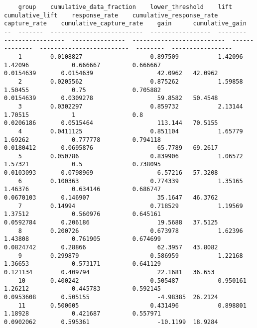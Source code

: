 \documentclass[11pt]{article}
\begin{document}
    
    \begin{verbatim}
    group    cumulative_data_fraction    lower_threshold    lift      cumulative_lift    response_rate    cumulative_response_rate    capture_rate    cumulative_capture_rate    gain      cumulative_gain
--  -------  --------------------------  -----------------  --------  -----------------  ---------------  --------------------------  --------------  -------------------------  --------  -----------------
    1        0.0108827                   0.897509           1.42096   1.42096            0.666667         0.666667                    0.0154639       0.0154639                  42.0962   42.0962
    2        0.0205562                   0.875262           1.59858   1.50455            0.75             0.705882                    0.0154639       0.0309278                  59.8582   50.4548
    3        0.0302297                   0.859732           2.13144   1.70515            1                0.8                         0.0206186       0.0515464                  113.144   70.5155
    4        0.0411125                   0.851104           1.65779   1.69262            0.777778         0.794118                    0.0180412       0.0695876                  65.7789   69.2617
    5        0.050786                    0.839906           1.06572   1.57321            0.5              0.738095                    0.0103093       0.0798969                  6.57216   57.3208
    6        0.100363                    0.774339           1.35165   1.46376            0.634146         0.686747                    0.0670103       0.146907                   35.1647   46.3762
    7        0.14994                     0.718529           1.19569   1.37512            0.560976         0.645161                    0.0592784       0.206186                   19.5688   37.5125
    8        0.200726                    0.673978           1.62396   1.43808            0.761905         0.674699                    0.0824742       0.28866                    62.3957   43.8082
    9        0.299879                    0.586959           1.22168   1.36653            0.573171         0.641129                    0.121134        0.409794                   22.1681   36.653
    10       0.400242                    0.505487           0.950161  1.26212            0.445783         0.592145                    0.0953608       0.505155                   -4.98385  26.2124
    11       0.500605                    0.431496           0.898801  1.18928            0.421687         0.557971                    0.0902062       0.595361                   -10.1199  18.9284

\end{verbatim}
\end{document}

